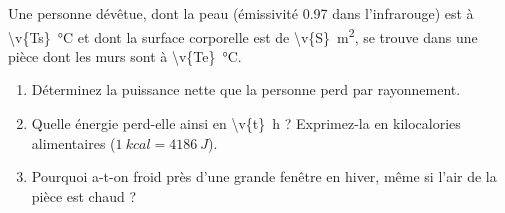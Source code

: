Une personne dévêtue, dont la peau (émissivité \num{0.97} dans l'infrarouge) est à \qty{\v{Ts}}{\degreeCelsius} et dont la surface corporelle est de \qty{\v{S}}{m^2}, se trouve dans une pièce dont les murs sont à \qty{\v{Te}}{\degreeCelsius}.

\begin{enumerate}[label=\alph*)]
    \item Déterminez la puissance nette que la personne perd par rayonnement.
    \item Quelle énergie perd-elle ainsi en \qty{\v{t}}{h} ? Exprimez-la en kilocalories alimentaires ($\qty{1}{kcal} = \qty{4186}{J}$).
    \item Pourquoi a-t-on froid près d'une grande fenêtre en hiver, même si l'air de la pièce est chaud ?
\end{enumerate}
